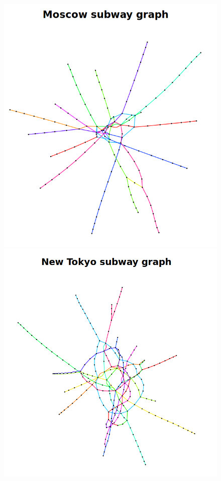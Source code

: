 \begin{figure}[!htb]
    \centering %
    \begin{minipage}[b]{0.24\textwidth} %
        \includegraphics[width=\textwidth]{images/CityGraph_Moscow.png}

    \end{minipage}
    \hfill %
    \begin{minipage}[b]{0.24\textwidth}
        \includegraphics[width=\textwidth]{images/CityGraph_New Tokyo.png}


\end{minipage}
\end{figure}
